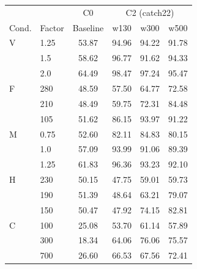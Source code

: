 \begin{tabular}{llcccc}
\hline
 & & C0 & \multicolumn{3}{c}{C2 (catch22)} \\
Cond. & Factor & Baseline & w130 & w300 & w500 \\ \hline
V & 1.25 & 53.87 & 94.96 & 94.22 & 91.78 \\
 & 1.5 & 58.62 & 96.77 & 91.62 & 94.33 \\
 & 2.0 & 64.49 & 98.47 & 97.24 & 95.47 \\
\hline
F & 280 & 48.59 & 57.50 & 64.77 & 72.58 \\
 & 210 & 48.49 & 59.75 & 72.31 & 84.48 \\
 & 105 & 51.62 & 86.15 & 93.97 & 91.22 \\
\hline
M & 0.75 & 52.60 & 82.11 & 84.83 & 80.15 \\
 & 1.0 & 57.09 & 93.99 & 91.06 & 89.39 \\
 & 1.25 & 61.83 & 96.36 & 93.23 & 92.10 \\
\hline
H & 230 & 50.15 & 47.75 & 59.01 & 59.73 \\
 & 190 & 51.39 & 48.64 & 63.21 & 79.07 \\
 & 150 & 50.47 & 47.92 & 74.15 & 82.81 \\
\hline
C & 100 & 25.08 & 53.70 & 61.14 & 57.89 \\
 & 300 & 18.34 & 64.06 & 76.06 & 75.57 \\
 & 700 & 26.60 & 66.53 & 67.56 & 72.41 \\
\hline
\end{tabular}
